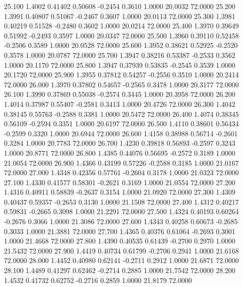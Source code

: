   25.100   1.4002   0.41402   0.50608  -0.2454   0.3610   1.0000  20.0032  72.0000
  25.200   1.3991   0.40807   0.51067  -0.2467   0.3607   1.0000  20.0113  72.0000
  25.300   1.3981   0.40219   0.51528  -0.2480   0.3602   1.0000  20.0214  72.0000
  25.400   1.3970   0.39649   0.51992  -0.2493   0.3597   1.0000  20.0347  72.0000
  25.500   1.3960   0.39110   0.52458  -0.2506   0.3589   1.0000  20.0528  72.0000
  25.600   1.3952   0.38621   0.52925  -0.2520   0.3578   1.0000  20.0787  72.0000
  25.700   1.3947   0.38216   0.53387  -0.2533   0.3562   1.0000  20.1170  72.0000
  25.800   1.3947   0.37939   0.53835  -0.2545   0.3539   1.0000  20.1720  72.0000
  25.900   1.3955   0.37812   0.54257  -0.2556   0.3510   1.0000  20.2414  72.0000
  26.000   1.3970   0.37802   0.54657  -0.2565   0.3478   1.0000  20.3177  72.0000
  26.100   1.3990   0.37869   0.55038  -0.2574   0.3445   1.0000  20.3958  72.0000
  26.200   1.4014   0.37987   0.55407  -0.2581   0.3413   1.0000  20.4726  72.0000
  26.300   1.4042   0.38145   0.55763  -0.2588   0.3381   1.0000  20.5472  72.0000
  26.400   1.4074   0.38345   0.56109  -0.2594   0.3351   1.0000  20.6197  72.0000
  26.500   1.4110   0.38601   0.56434  -0.2599   0.3320   1.0000  20.6944  72.0000
  26.600   1.4158   0.38988   0.56714  -0.2601   0.3284   1.0000  20.7783  72.0000
  26.700   1.4230   0.39818   0.56893  -0.2597   0.3243   1.0000  20.8771  72.0000
  26.800   1.4385   0.44076   0.56695  -0.2572   0.3189   1.0000  21.0054  72.0000
  26.900   1.4366   0.43199   0.57226  -0.2588   0.3185   1.0000  21.0167  72.0000
  27.000   1.4348   0.42356   0.57761  -0.2604   0.3178   1.0000  21.0323  72.0000
  27.100   1.4330   0.41577   0.58301  -0.2621   0.3169   1.0000  21.0554  72.0000
  27.200   1.4316   0.40911   0.58839  -0.2637   0.3154   1.0000  21.0920  72.0000
  27.300   1.4309   0.40437   0.59357  -0.2653   0.3130   1.0000  21.1508  72.0000
  27.400   1.4312   0.40217   0.59831  -0.2665   0.3098   1.0000  21.2291  72.0000
  27.500   1.4324   0.40193   0.60264  -0.2676   0.3066   1.0000  21.3086  72.0000
  27.600   1.4343   0.40258   0.60673  -0.2685   0.3033   1.0000  21.3881  72.0000
  27.700   1.4365   0.40376   0.61064  -0.2693   0.3001   1.0000  21.4668  72.0000
  27.800   1.4390   0.40535   0.61439  -0.2700   0.2970   1.0000  21.5432  72.0000
  27.900   1.4419   0.40734   0.61799  -0.2706   0.2941   1.0000  21.6168  72.0000
  28.000   1.4452   0.40980   0.62141  -0.2711   0.2912   1.0000  21.6871  72.0000
  28.100   1.4489   0.41297   0.62462  -0.2714   0.2885   1.0000  21.7542  72.0000
  28.200   1.4532   0.41732   0.62752  -0.2716   0.2859   1.0000  21.8179  72.0000
